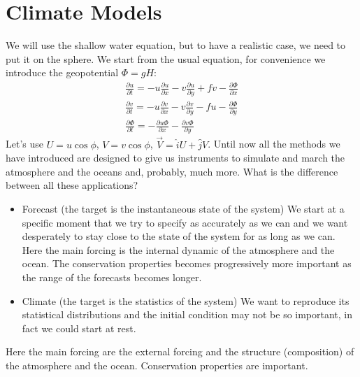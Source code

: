 
\chapter{Climate Models}

We will use the shallow water equation, but to have a realistic case, we need to put it on the sphere. We start from the usual equation, for convenience we introduce the geopotential $\Phi=gH$:
\begin{align}
	\frac{\partial u}{\partial t}=-u\frac{\partial u}{\partial x}-v\frac{\partial u}{\partial y}+fv-\frac{\partial \Phi}{\partial x} \\
	\frac{\partial v}{\partial t}=-u\frac{\partial v}{\partial x}-v\frac{\partial v}{\partial y}-fu-\frac{\partial \Phi}{\partial y} \\
	\frac{\partial \Phi}{\partial t}=-\frac{\partial u\Phi}{\partial x}-\frac{\partial v\Phi}{\partial y}
\end{align}
Let's use $U=u\cos\phi$, $V=v\cos\phi$, $\vec{V}=\hat{i}U+\hat{j}V$. Until now all the methods we have introduced are designed to give us instruments to simulate and march the atmosphere and the oceans and, probably, much more.
What is the difference between all these applications?
\begin{itemize}
	\item Forecast (the target is the instantaneous state of the system)
	      We start at a specific moment that we try to specify as accurately as we can and we want desperately to stay close to the state of the system for as long as we can.
	      Here the main forcing is the internal dynamic of the atmosphere and the ocean. The conservation properties becomes progressively more important as the range of the forecasts becomes longer.
	\item Climate (the target is the statistics of the system)
	      We want to reproduce its statistical distributions and the initial condition may not be so important, in fact we could start at rest.
\end{itemize}
Here the main forcing are the external forcing and the structure (composition) of the atmosphere and the ocean. Conservation properties are important.


